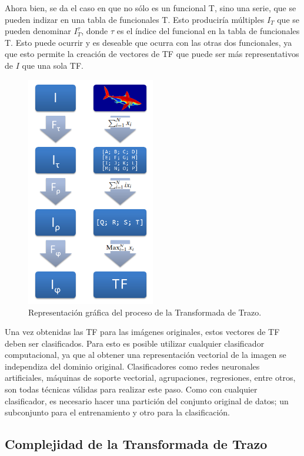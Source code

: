 Ahora bien, se da el caso en que no sólo es un funcional T, sino una serie, que se pueden indizar en una tabla de funcionales T. Esto produciría múltiples $I_T$ que se pueden denominar $I_T^\tau$, donde $\tau$ es el índice del funcional en la tabla de funcionales T. Esto puede ocurrir y es deseable que ocurra con las otras dos funcionales, ya que esto permite la creación de vectores de TF que puede ser más representativos de $I$ que una sola TF.

\begin{figure}[h!]
    \centering
    \includegraphics[width=0.5\textwidth]{images/tt.png}
    \caption{Representación gráfica del proceso de la Transformada de Trazo.}
    \label{fig:TT}
\end{figure}

Una vez obtenidas las TF para las imágenes originales, estos vectores de TF deben ser clasificados. Para esto es posible utilizar cualquier clasificador computacional, ya que al obtener una representación vectorial de la imagen se independiza del dominio original.
Clasificadores como redes neuronales artificiales, máquinas de soporte vectorial, agrupaciones, regresiones, entre otros, son todas técnicas válidas para realizar este paso\cite{Ethem2010}.
Como con cualquier clasificador, es necesario hacer una partición del conjunto original de datos; un subconjunto para el entrenamiento y otro para la clasificación.

\subsection{Complejidad de la Transformada de Trazo}

